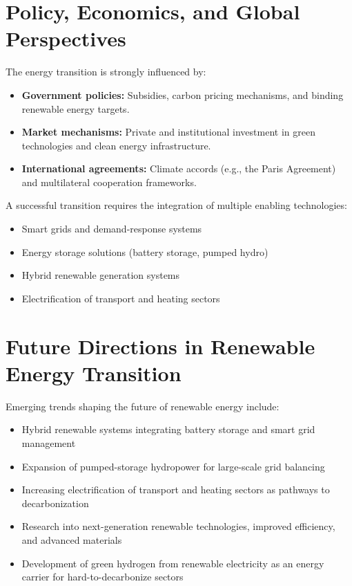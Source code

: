 \documentclass[12pt,a4paper]{article}
\begin{document}
\section{Policy, Economics, and Global Perspectives}

The energy transition is strongly influenced by:
\begin{itemize}
    \item \textbf{Government policies:} Subsidies, carbon pricing mechanisms, and binding renewable energy targets.
    \item \textbf{Market mechanisms:} Private and institutional investment in green technologies and clean energy infrastructure.
    \item \textbf{International agreements:} Climate accords (e.g., the Paris Agreement) and multilateral cooperation frameworks.
\end{itemize}

A successful transition requires the integration of multiple enabling technologies:
\begin{itemize}
    \item Smart grids and demand-response systems
    \item Energy storage solutions (battery storage, pumped hydro)
    \item Hybrid renewable generation systems
    \item Electrification of transport and heating sectors
\end{itemize}

\section{Future Directions in Renewable Energy Transition}

Emerging trends shaping the future of renewable energy include:
\begin{itemize}
    \item Hybrid renewable systems integrating battery storage and smart grid management
    \item Expansion of pumped-storage hydropower for large-scale grid balancing
    \item Increasing electrification of transport and heating sectors as pathways to decarbonization
    \item Research into next-generation renewable technologies, improved efficiency, and advanced materials
    \item Development of green hydrogen from renewable electricity as an energy carrier for hard-to-decarbonize sectors
\end{itemize}
\end{document}
